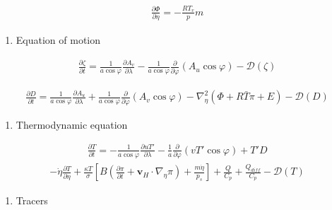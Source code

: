 \begin{eqnarray}
  \frac{\partial \Phi}{\partial \eta} = - \frac{RT_v}{p} m
\end{eqnarray}

\begin{enumerate}
\def\labelenumi{\arabic{enumi}.}
\setcounter{enumi}{2}
\tightlist
\item
  Equation of motion
\end{enumerate}

\begin{eqnarray}
  \frac{\partial \zeta}{\partial t} 
     =   \frac{1}{a\cos\varphi}
            \frac{\partial A_v}{\partial \lambda}
          - \frac{1}{a\cos \varphi}
            \frac{\partial}{\partial \varphi} ( A_u \cos\varphi )
          - {\mathcal D}(\zeta) 
\end{eqnarray}

\begin{eqnarray}
  \frac{\partial D}{\partial t} 
     =    \frac{1}{a\cos\varphi}
            \frac{\partial A_u}{\partial \lambda}
          + \frac{1}{a\cos\varphi}
            \frac{\partial }{\partial \varphi} ( A_v \cos\varphi )
          - \nabla^{2}_{\eta}
           ( \Phi + R \bar{T} \pi + E ) 
          - {\mathcal D}(D) 
\end{eqnarray}

\begin{enumerate}
\def\labelenumi{\arabic{enumi}.}
\setcounter{enumi}{3}
\tightlist
\item
  Thermodynamic equation
\end{enumerate}

\begin{eqnarray}
  \frac{\partial T}{\partial t}
     =  - \frac{1}{a\cos\varphi}
               \frac{\partial uT'}{\partial \lambda}
          - \frac{1}{a}
               \frac{\partial }{\partial \varphi} ( vT' \cos\varphi )
          + T' D
\end{eqnarray} \begin{eqnarray}
        - \dot{\eta} 
              \frac{\partial T }{\partial \eta}
          + \frac{\kappa T}{\sigma} \left[ B\left( \frac{\partial \pi}{\partial t}
                            + {\mathbf{v}}_{H} \cdot \nabla_{\eta}\pi \right)
                            + \frac{ m\dot{\eta} }{ p_s }
                     \right]
          + \frac{Q}{C_{p}}
          + \frac{Q_{diff}}{C_{p}}
          - {\mathcal D}(T) 
\end{eqnarray}

\begin{enumerate}
\def\labelenumi{\arabic{enumi}.}
\setcounter{enumi}{4}
\tightlist
\item
  Tracers
\end{enumerate}

